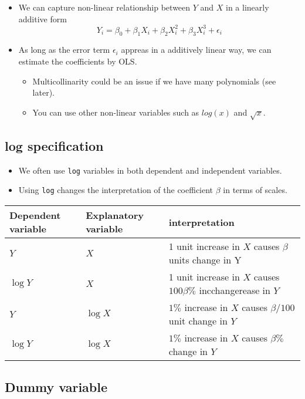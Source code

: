 \documentclass[]{book}
\providecommand{\tightlist}{%
  \setlength{\itemsep}{0pt}\setlength{\parskip}{0pt}}
\begin{document}
\begin{itemize}
\tightlist
\item
  We can capture non-linear relationship between \(Y\) and \(X\) in a linearly additive form
  \[
    Y_i = \beta_0 + \beta_1 X_i + \beta_2 X_i^2 + \beta_3 X_i^3 + \epsilon_i
    \]
\item
  As long as the error term \(\epsilon_i\) appreas in a additively linear way, we can estimate the coefficients by OLS.

  \begin{itemize}
  \tightlist
  \item
    Multicollinarity could be an issue if we have many polynomials (see later).
  \item
    You can use other non-linear variables such as \(log(x)\) and \(\sqrt{x}\).
  \end{itemize}
\end{itemize}

\hypertarget{log-specification}{%
\subsection{log specification}\label{log-specification}}

\begin{itemize}
\tightlist
\item
  We often use \texttt{log} variables in both dependent and independent variables.
\item
  Using \texttt{log} changes the interpretation of the coefficient \(\beta\) in terms of scales.
\end{itemize}

\begin{longtable}[]{@{}lll@{}}
\toprule
Dependent variable & Explanatory variable & interpretation\tabularnewline
\midrule
\endhead
\(Y\) & \(X\) & 1 unit increase in \(X\) causes \(\beta\) units change in Y\tabularnewline
\(\log Y\) & \(X\) & 1 unit increase in \(X\) causes \(100 \beta \%\) incchangerease in \(Y\)\tabularnewline
\(Y\) & \(\log X\) & \(1\%\) increase in \(X\) causes \(\beta / 100\) unit change in \(Y\)\tabularnewline
\(\log Y\) & \(\log X\) & \(1\%\) increase in \(X\) causes \(\beta \%\) change in \(Y\)\tabularnewline
\bottomrule
\end{longtable}

\hypertarget{dummy-variable}{%
\subsection{Dummy variable}\label{dummy-variable}}
\end{document}
